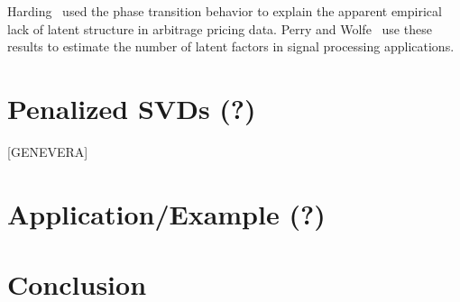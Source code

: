 \documentclass{eoeauth}
\begin{document}
Harding~\cite{harding2008explaining} used the phase transition
behavior to explain the apparent empirical lack of latent
structure in arbitrage pricing data.  Perry and
Wolfe~\cite{perry2010minimax} use these results to estimate the number
of latent factors in signal processing applications.



\section{Penalized SVDs (?)}
[GENEVERA]

\section{Application/Example (?)}

\section{Conclusion}



\end{document}
